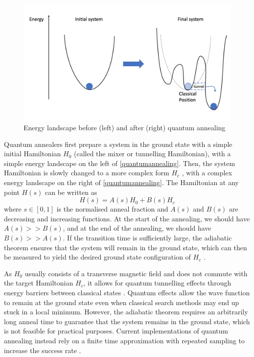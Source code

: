 \begin{figure}[h!]
    \centering
    \includegraphics[width=0.8\linewidth]{images/quantum_annealing.png}
    \caption{Energy landscape before (left) and after (right) quantum annealing}
    \label{quantumannealing}
\end{figure}
Quantum annealers first prepare a system in the ground state with a simple initial Hamiltonian $H_0$ (called the mixer or tunnelling Hamiltonian), with a simple energy landscape on the left of \autoref{quantumannealing}. Then, the system Hamiltonian is slowly changed to a more complex form $H_c$ \cite{b10}, with a complex energy landscape on the right of \autoref{quantumannealing}. The Hamiltonian at any point $H(s)$ can be written as
\begin{equation}
    \label{eqn:annealinghamiltonian}
    H(s) = A(s)H_0 + B(s)H_c
\end{equation}
where $s \in [0,1]$ is the normalised anneal fraction and $A(s)$ and $B(s)$ are decreasing and increasing functions. At the start of the annealing, we should have $A(s) >> B(s)$, and at the end of the annealing, we should have $B(s) >> A(s)$. If the transition time is sufficiently large, the adiabatic theorem ensures that the system will remain in the ground state, which can then be measured to yield the desired ground state configuration of $H_c$ \cite{b14}. 

As $H_0$ usually consists of a transverse magnetic field and does not commute with the target Hamiltonian $H_c$, it allows for quantum tunnelling effects through energy barriers between classical states \cite{kadowaki1998quantum}. Quantum effects allow the wave function to remain at the ground state even when classical search methods may end up stuck in a local minimum. However, the adiabatic theorem requires an arbitrarily long anneal time to guarantee that the system remains in the ground state, which is not feasible for practical purposes. Current implementations of quantum annealing instead rely on a finite time approximation with repeated sampling to increase the success rate \cite{farhi2001}.

